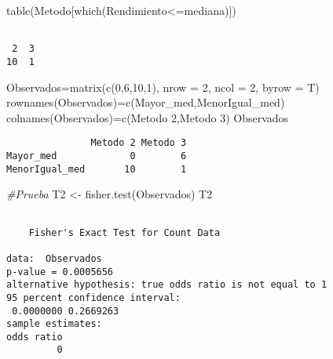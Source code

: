 \documentclass[
  a4paper,
  oneside,
  openany]{book}
\newenvironment{Shaded}{\begin{snugshade}}{\end{snugshade}}
\newcommand{\AttributeTok}[1]{\textcolor[rgb]{0.77,0.63,0.00}{#1}}
\newcommand{\CommentTok}[1]{\textcolor[rgb]{0.56,0.35,0.01}{\textit{#1}}}
\newcommand{\DecValTok}[1]{\textcolor[rgb]{0.00,0.00,0.81}{#1}}
\newcommand{\FunctionTok}[1]{\textcolor[rgb]{0.00,0.00,0.00}{#1}}
\newcommand{\NormalTok}[1]{#1}
\newcommand{\OtherTok}[1]{\textcolor[rgb]{0.56,0.35,0.01}{#1}}
\newcommand{\SpecialCharTok}[1]{\textcolor[rgb]{0.00,0.00,0.00}{#1}}
\newcommand{\StringTok}[1]{\textcolor[rgb]{0.31,0.60,0.02}{#1}}
\begin{document}
\begin{Shaded}
\begin{Highlighting}[]
\FunctionTok{table}\NormalTok{(Metodo[}\FunctionTok{which}\NormalTok{(Rendimiento}\SpecialCharTok{\textless{}=}\NormalTok{mediana)])}
\end{Highlighting}
\end{Shaded}

\begin{verbatim}

 2  3 
10  1 
\end{verbatim}

\begin{Shaded}
\begin{Highlighting}[]
\NormalTok{Observados}\OtherTok{=}\FunctionTok{matrix}\NormalTok{(}\FunctionTok{c}\NormalTok{(}\DecValTok{0}\NormalTok{,}\DecValTok{6}\NormalTok{,}\DecValTok{10}\NormalTok{,}\DecValTok{1}\NormalTok{), }\AttributeTok{nrow =} \DecValTok{2}\NormalTok{, }\AttributeTok{ncol =} \DecValTok{2}\NormalTok{, }\AttributeTok{byrow =}\NormalTok{ T)}
\FunctionTok{rownames}\NormalTok{(Observados)}\OtherTok{=}\FunctionTok{c}\NormalTok{(}\StringTok{\textquotesingle{}Mayor\_med\textquotesingle{}}\NormalTok{,}\StringTok{\textquotesingle{}MenorIgual\_med\textquotesingle{}}\NormalTok{)}
\FunctionTok{colnames}\NormalTok{(Observados)}\OtherTok{=}\FunctionTok{c}\NormalTok{(}\StringTok{\textquotesingle{}Metodo 2\textquotesingle{}}\NormalTok{,}\StringTok{\textquotesingle{}Metodo 3\textquotesingle{}}\NormalTok{)}
\NormalTok{Observados}
\end{Highlighting}
\end{Shaded}

\begin{verbatim}
               Metodo 2 Metodo 3
Mayor_med             0        6
MenorIgual_med       10        1
\end{verbatim}

\begin{Shaded}
\begin{Highlighting}[]
\CommentTok{\#Prueba}
\NormalTok{T2 }\OtherTok{\textless{}{-}} \FunctionTok{fisher.test}\NormalTok{(Observados)}
\NormalTok{T2}
\end{Highlighting}
\end{Shaded}

\begin{verbatim}

    Fisher's Exact Test for Count Data

data:  Observados
p-value = 0.0005656
alternative hypothesis: true odds ratio is not equal to 1
95 percent confidence interval:
 0.0000000 0.2669263
sample estimates:
odds ratio 
         0 
\end{verbatim}
\end{document}
